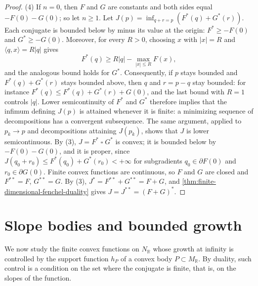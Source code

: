 \begin{proof}
(4) If $n=0$, then $F$ and $G$ are constants and both sides equal $-F(0)-G(0)$; so let $n\geq1$. Let $J(p)=\inf_{q+r=p}(F^*(q)+G^*(r))$. Each conjugate is bounded below by minus its value at the origin: $F^*\geq-F(0)$ and $G^*\geq-G(0)$. Moreover, for every $R>0$, choosing $x$ with $|x|=R$ and $\langle q,x\rangle=R|q|$ gives
\[
 F^*(q)\geq R|q|-\max_{|x|\leq R}F(x),
\]
and the analogous bound holds for $G^*$. Consequently, if $p$ stays bounded and $F^*(q)+G^*(r)$ stays bounded above, then $q$ and $r=p-q$ stay bounded: for instance $F^*(q)\leq F^*(q)+G^*(r)+G(0)$, and the last bound with $R=1$ controls $|q|$. Lower semicontinuity of $F^*$ and $G^*$ therefore implies that the infimum defining $J(p)$ is attained whenever it is finite: a minimizing sequence of decompositions has a convergent subsequence. The same argument, applied to $p_k\to p$ and decompositions attaining $J(p_k)$, shows that $J$ is lower semicontinuous. By (3), $J=F^*\mathbin\square G^*$ is convex; it is bounded below by $-F(0)-G(0)$, and it is proper, since $J(q_0+r_0)\leq F^*(q_0)+G^*(r_0)<+\infty$ for subgradients $q_0\in\partial F(0)$ and $r_0\in\partial G(0)$. Finite convex functions are continuous, so $F$ and $G$ are closed and $F^{**}=F$, $G^{**}=G$. By (3), $J^*=F^{**}+G^{**}=F+G$, and \cref{thm:finite-dimensional-fenchel-duality} gives $J=J^{**}=(F+G)^*$.
\end{proof}

\section{Slope bodies and bounded growth}
\label{sec:convex-slope-bodies}
We now study the finite convex functions on $N_{\mathbb R}$ whose growth at infinity is controlled by the support function $h_P$ of a convex body $P\subset M_{\mathbb R}$. By duality, such control is a condition on the set where the conjugate is finite, that is, on the slopes of the function.

